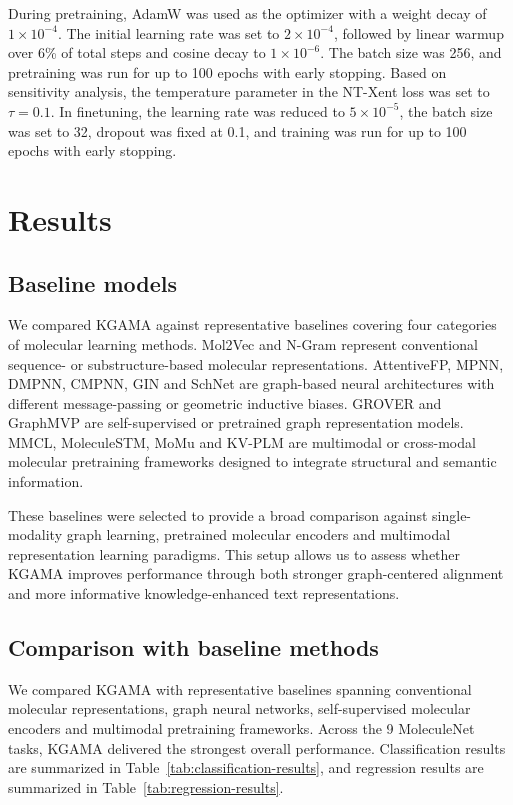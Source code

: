 \documentclass[webpdf,contemporary,large]{oup-authoring-template}%
\begin{document}
During pretraining, AdamW was used as the optimizer with a weight decay of $1\times10^{-4}$. The initial learning rate was set to $2\times10^{-4}$, followed by linear warmup over 6\% of total steps and cosine decay to $1\times10^{-6}$. The batch size was 256, and pretraining was run for up to 100 epochs with early stopping. Based on sensitivity analysis, the temperature parameter in the NT-Xent loss was set to $\tau=0.1$. In finetuning, the learning rate was reduced to $5\times10^{-5}$, the batch size was set to 32, dropout was fixed at 0.1, and training was run for up to 100 epochs with early stopping.

\section{Results}
\subsection{Baseline models}
We compared KGAMA against representative baselines covering four categories of molecular learning methods. Mol2Vec and N-Gram represent conventional sequence- or substructure-based molecular representations. AttentiveFP, MPNN, DMPNN, CMPNN, GIN and SchNet are graph-based neural architectures with different message-passing or geometric inductive biases. GROVER and GraphMVP are self-supervised or pretrained graph representation models. MMCL, MoleculeSTM, MoMu and KV-PLM are multimodal or cross-modal molecular pretraining frameworks designed to integrate structural and semantic information.

These baselines were selected to provide a broad comparison against single-modality graph learning, pretrained molecular encoders and multimodal representation learning paradigms. This setup allows us to assess whether KGAMA improves performance through both stronger graph-centered alignment and more informative knowledge-enhanced text representations.

\subsection{Comparison with baseline methods}
We compared KGAMA with representative baselines spanning conventional molecular representations, graph neural networks, self-supervised molecular encoders and multimodal pretraining frameworks. Across the 9 MoleculeNet tasks, KGAMA delivered the strongest overall performance. Classification results are summarized in Table~\ref{tab:classification-results}, and regression results are summarized in Table~\ref{tab:regression-results}.
\end{document}
